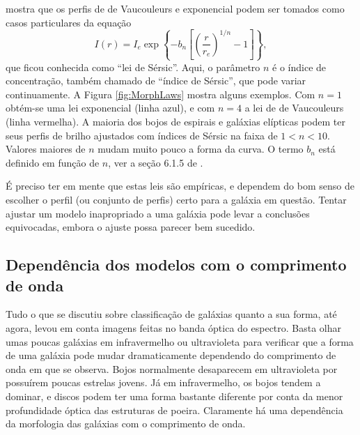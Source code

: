 \citet{Sersic1963} mostra que os perfis de de Vaucouleurs e exponencial podem
ser tomados como casos particulares da equação
\begin{equation*}
I(r) = I_e \exp \left\{- b_n \left[ \left( \frac{r}{r_e} \right)^{1/n}
- 1 \right] \right\},
\end{equation*}
que ficou conhecida como ``lei de Sérsic''. Aqui, o parâmetro $n$ é o índice de
concentração, também chamado de ``índice de Sérsic'', que pode variar
continuamente. A Figura \ref{fig:MorphLaws} mostra alguns exemplos. Com
$n\!=\!1$ obtém-se uma lei exponencial (linha azul), e com $n\!=\!4$ a lei de de
Vaucouleurs (linha vermelha). A maioria dos bojos de espirais e galáxias
elípticas podem ter seus perfis de brilho ajustados com índices de Sérsic na
faixa de $1 < n < 10$. Valores maiores de $n$ mudam muito pouco a forma da
curva. O termo $b_n$ está definido em função de $n$, ver a seção 6.1.5 de
\citet{Erwin2015}.

É preciso ter em mente que estas leis são empíricas, e dependem do bom senso de
escolher o perfil (ou conjunto de perfis) certo para a galáxia em questão.
Tentar ajustar um modelo inapropriado a uma galáxia pode levar a conclusões
equivocadas, embora o ajuste possa parecer bem sucedido.


\subsection{Dependência dos modelos com o comprimento de onda}
\label{sec:morph:comp:depLambda}

Tudo o que se discutiu sobre classificação de galáxias quanto a sua forma, até
agora, levou em conta imagens feitas no banda óptica do espectro. Basta olhar
umas poucas galáxias em infravermelho ou ultravioleta para verificar que a forma
de uma galáxia pode mudar dramaticamente dependendo do comprimento de onda em
que se observa. Bojos normalmente desaparecem em ultravioleta por possuírem
poucas estrelas jovens. Já em infravermelho, os bojos tendem a dominar, e discos
podem ter uma forma bastante diferente por conta da menor profundidade óptica
das estruturas de poeira. Claramente há uma dependência da morfologia das
galáxias com o comprimento de onda.

